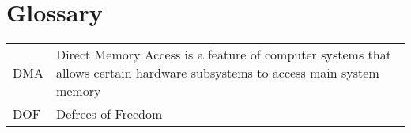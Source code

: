 \section{Glossary}
\begin{table}[H]
    
    \begin{tabular}{p{} p{}}
       DMA  & Direct Memory Access is a feature of computer systems that allows certain hardware subsystems to access main system memory  \\
       DOF & Defrees of Freedom
    \end{tabular}
\end{table}
